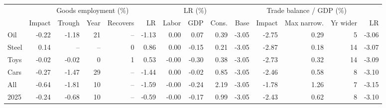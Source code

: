 \begin{tabular}{lrrrrrrrrrrrrr}
\toprule
 & \multicolumn{5}{c}{Goods employment (\%)} & \multicolumn{3}{c}{LR (\%)} & \multicolumn{5}{c}{Trade balance / GDP (\%)} \\
\cmidrule(lr){2-6}\cmidrule(lr){7-9}\cmidrule(lr){10-14}
 & Impact & Trough & Year & Recovers & LR & Labor & GDP & Cons. & Base & Impact & Max narrow. & Yr wider & LR \\
\midrule
Oil & -0.22 & -1.18 & 21 & -- & -1.13 & 0.00 & 0.07 & 0.39 & -3.05 & -2.75 & 0.29 & 5 & -3.06 \\
Steel & 0.14 & -- & -- & 0 & 0.86 & 0.00 & -0.15 & 0.21 & -3.05 & -2.87 & 0.18 & 14 & -3.07 \\
Toys & -0.02 & -0.02 & 0 & 1 & 0.53 & -0.00 & -0.30 & 0.38 & -3.05 & -2.73 & 0.32 & 14 & -3.09 \\
Cars & -0.27 & -1.47 & 29 & -- & -1.44 & 0.00 & -0.02 & 0.85 & -3.05 & -2.46 & 0.58 & 8 & -3.10 \\
All & -0.64 & -1.81 & 10 & -- & -1.59 & -0.00 & -0.24 & 2.19 & -3.05 & -1.78 & 1.26 & 7 & -3.15 \\
2025 & -0.24 & -0.68 & 10 & -- & -0.59 & -0.00 & -0.17 & 0.99 & -3.05 & -2.43 & 0.62 & 8 & -3.10 \\
\bottomrule
\end{tabular}

